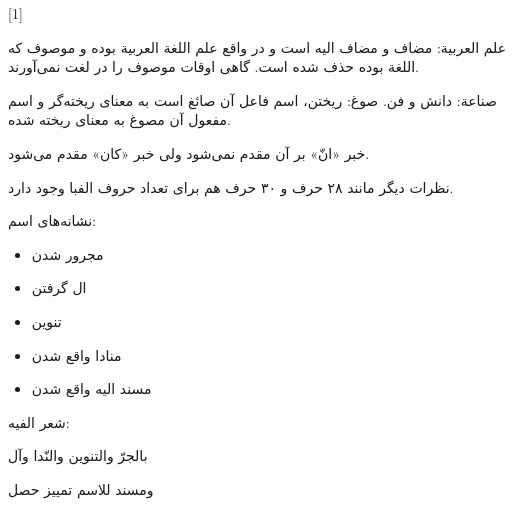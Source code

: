 \documentclass{article}
\begin{document}
\def\labelitemi{$-$}

\newenvironment{note}
               {
                 \begin{tcolorbox}[width=0.3\linewidth]
                 \begin{RTL}
               }
               {
                 \end{RTL}
                 \end{tcolorbox}
               }
              
[1]{
  
}


\begin{addpage}{1}
    \vspace*{6cm}
    \begin{note}
        علم العربیة: مضاف و مضاف الیه است و در واقع علم اللغة العربیة بوده و موصوف که اللغة بوده حذف شده است. 
        گاهی اوقات موصوف را در لغت نمی‌آورند.
    \end{note}
    \begin{note}
      صناعة: دانش و فن.
      صوغ: ریختن، اسم فاعل آن صائغ است به معنای ریخته‌گر و اسم مفعول آن مصوغ به معنای ریخته شده.
    \end{note}
    \begin{note}
      خبر «انّ» بر آن مقدم نمی‌شود ولی خبر «کان» مقدم می‌شود.
    \end{note}
    \vspace*{4cm}
    \begin{note}
      نظرات دیگر مانند ۲۸ حرف و ۳۰ حرف هم برای تعداد حروف الفبا وجود دارد.
      \end{note}
    \begin{note}
      نشانه‌های اسم:
      \begin{itemize}
      \item مجرور شدن
      \item ال گرفتن
      \item تنوین
      \item منادا واقع شدن
      \item مسند الیه واقع شدن
      \end{itemize}
      
      شعر الفیه:

بالجرّ والتنوين والنّدا وآل
  
ومسند للاسم تمييز حصل


    \end{note}
\end{addpage}
\end{document}

